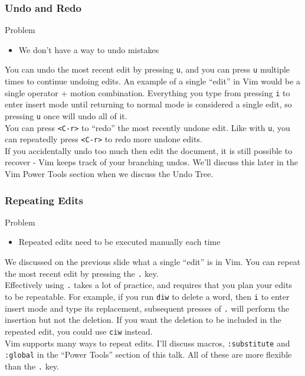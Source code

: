 \documentclass{beamer}
\begin{document}
\begin{frame}[fragile]
    \frametitle{Undo and Redo}
    \small
    \begin{block}{Problem}
	\begin{itemize}
	    \item We don't have a way to undo mistakes
	\end{itemize}
    \end{block}
    You can undo the most recent edit by pressing \verb+u+, and you can press \verb+u+ multiple times to continue undoing edits. An example of a single \enquote{edit} in Vim would be a single operator + motion combination. Everything you type from pressing \verb+i+ to enter insert mode until returning to normal mode is considered a single edit, so pressing \verb+u+ once will undo all of it.\\
    \vspace{0.5cm}
    You can press \verb+<C-r>+ to \enquote{redo} the most recently undone edit. Like with \verb+u+, you can repeatedly press \verb+<C-r>+ to redo more undone edits.\\
    \vspace{0.5cm}
    If you accidentally undo too much then edit the document, it is still possible to recover - Vim keeps track of your branching undos. We'll discuss this later in the Vim Power Tools section when we discuss the Undo Tree.
\end{frame}

\begin{frame}[fragile]
    \frametitle{Repeating Edits}
    \small
    \begin{block}{Problem}
	\begin{itemize}
	    \item Repeated edits need to be executed manually each time
	\end{itemize}
    \end{block}
    We discussed on the previous slide what a single \enquote{edit} is in Vim. You can repeat the most recent edit by pressing the \verb+.+ key.\\
    \vspace{0.5cm}
    Effectively using \verb+.+ takes a lot of practice, and requires that you plan your edits to be repeatable. For example, if you run \verb+diw+ to delete a word, then \verb+i+ to enter insert mode and type its replacement, subsequent presses of \verb+.+ will perform the insertion but not the deletion. If you want the deletion to be included in the repeated edit, you could use \verb+ciw+ instead.\\
    \vspace{0.5cm}
    Vim supports many ways to repeat edits. I'll discuss macros, \verb+:substitute+ and \verb+:global+ in the \enquote{Power Tools} section of this talk. All of these are more flexible than the \verb+.+ key.
\end{frame}
\end{document}
